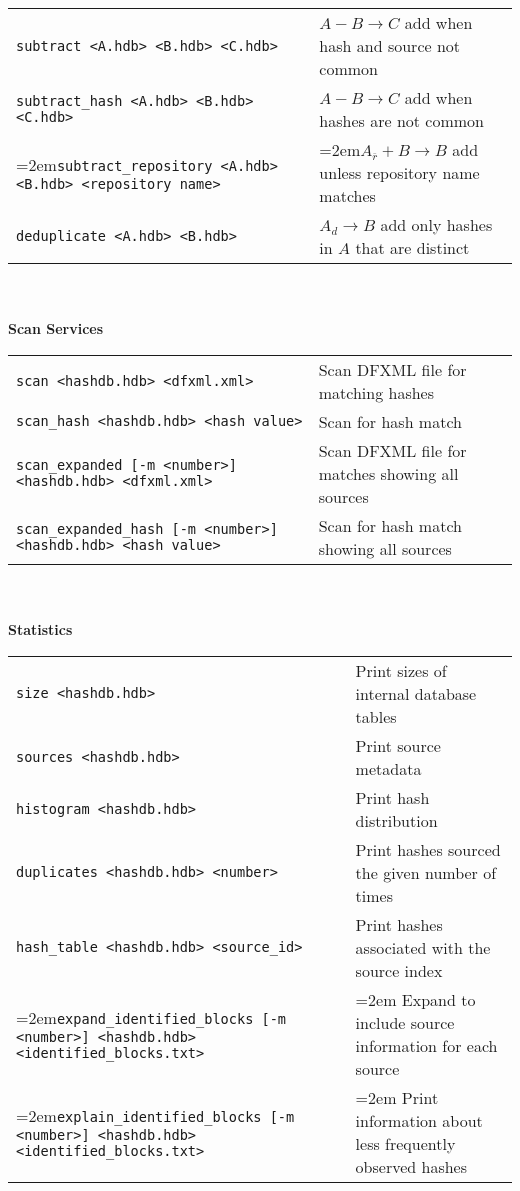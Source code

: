 \begin{small}
\begin{footnotesize}
\begin{tabular}{p{3.6 in} p{3.0 in}}
\texttt{subtract <A.hdb> <B.hdb> <C.hdb>} & $A - B \rightarrow C$ add when hash and source not common\\
\texttt{subtract\_hash <A.hdb> <B.hdb> <C.hdb>} & $A - B \rightarrow C$ add when hashes are not common\\
\hangindent=2em\texttt{subtract\_repository <A.hdb> <B.hdb> <repository name>} & \hangindent=2em$A_{\overline{r}} + B \rightarrow B$ add unless repository name matches\\
\texttt{deduplicate <A.hdb> <B.hdb>} & $A_d \rightarrow B$ add only hashes in $A$ that are distinct\\
\end{tabular}
\\
\\
\textbf{Scan Services} \\
\begin{tabular}{p{3.6 in} p{3.0 in}}
\texttt{scan <hashdb.hdb> <dfxml.xml>} & Scan DFXML file for matching hashes \\
\texttt{scan\_hash <hashdb.hdb> <hash value>} & Scan for hash match \\
\texttt{scan\_expanded [-m <number>] <hashdb.hdb> <dfxml.xml>} & Scan DFXML file for matches showing all sources\\
\texttt{scan\_expanded\_hash [-m <number>] <hashdb.hdb> <hash value>} & Scan for hash match showing all sources\\
\end{tabular}
\\
\\
\textbf{Statistics}\\
\begin{tabular}{p{3.6 in} p{3.0 in}}
\texttt{size <hashdb.hdb>} & Print sizes of internal database tables \\
\texttt{sources <hashdb.hdb>} & Print source metadata \\
\texttt{histogram <hashdb.hdb>} & Print hash distribution \\
\texttt{duplicates <hashdb.hdb> <number>} & Print hashes sourced the given number of times \\
\texttt{hash\_table <hashdb.hdb> <source\_id>} & Print hashes associated with the source index\\
\hangindent=2em\texttt{expand\_identified\_blocks [-m <number>] <hashdb.hdb> <identified\_blocks.txt>} & \hangindent=2em Expand to include source information for each source \\
\hangindent=2em\texttt{explain\_identified\_blocks [-m <number>] <hashdb.hdb> <identified\_blocks.txt>} & \hangindent=2em Print information about less frequently observed hashes\\

\end{tabular}
\end{footnotesize}
\end{small}
